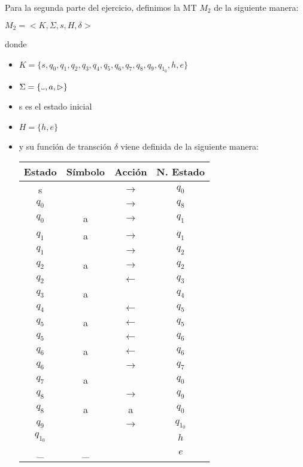 \documentclass[11pt, a4paper, titlepage]{article}
\newcommand\vartextvisiblespace[1][.5em]{%
  \makebox[#1]{%
    \kern.07em
    \vrule height.3ex
    \hrulefill
    \vrule height.3ex
    \kern.07em
  }%
}
\begin{document}
\hfill \break
Para la segunda parte del ejercicio, definimos la MT $M_2$ de la
siguiente manera:

$ M_2 = < K, \Sigma, s, H, \delta >$

donde

\begin{itemize}
\item $ K = \{ s, q_0, q_1, q_2, q_3, q_4, q_5, q_6, q_7, q_8, q_9, q_1_0, h, e \}$
\item $ \Sigma = \{\vartextvisiblespace, a, \rhd \}$
\item s es el estado inicial
\item $ H = \{ h, e \}$
\item y su función de transción $\delta$ viene definida de la siguiente manera:
  \begin{center}
    \begin{tabular}{|| c c c c ||}
      \hline
      Estado & Símbolo & Acción & N. Estado \\ [0.5ex]
      \hline\hline
      s & \vartextvisiblespace & $\rightarrow$ & $q_0$ \\
      \hline
      $q_0$ & \vartextvisiblespace & $\rightarrow$ & $q_8$ \\
      \hline
      $q_0$ & a & $\rightarrow$ & $q_1$ \\
      \hline
      $q_1$ & a & $\rightarrow$ & $q_1$ \\
      \hline
      $q_1$ & \vartextvisiblespace & $\rightarrow$ & $q_2$ \\
      \hline
      $q_2$ & a & $\rightarrow$ & $q_2$ \\
      \hline
      $q_2$ & \vartextvisiblespace & $\leftarrow$ &$q_3$ \\
      \hline
      $q_3$ & a & \vartextvisiblespace & $q_4$ \\
      \hline
      $q_4$ & \vartextvisiblespace & $\leftarrow$ & $q_5$ \\
      \hline
      $q_5$ & a & $\leftarrow$ & $q_5$ \\
      \hline
      $q_5$ & \vartextvisiblespace & $\leftarrow$ & $q_6$ \\
      \hline
      $q_6$ & a & $\leftarrow$ & $q_6$ \\
      \hline
      $q_6$ & \vartextvisiblespace & $\rightarrow$ & $q_7$ \\
      \hline
      $q_7$ & a & \vartextvisiblespace & $q_0$ \\
      \hline
      $q_8$ & \vartextvisiblespace & $\rightarrow$ & $q_9$ \\
      \hline
      $q_8$ & a & a & $q_0$ \\
      \hline
      $q_9$ & \vartextvisiblespace & $\rightarrow$ & $q_1_0$ \\
      \hline
      $q_1_0$ & \vartextvisiblespace & \vartextvisiblespace & $h$ \\
      \hline
      \_ & \_ & \vartextvisiblespace & $e$ \\
      \hline
    \end{tabular}
\end{center}
\end{itemize}
\end{document}
